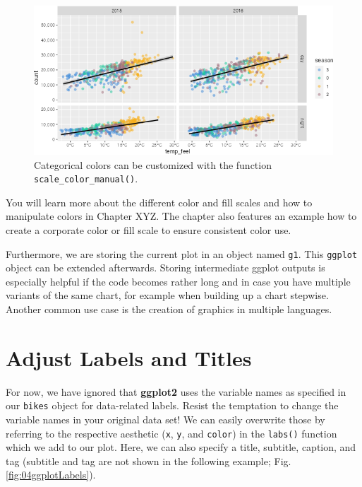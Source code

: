 \documentclass[
]{krantz}
\begin{document}
\begin{figure}
\centering
\includegraphics{bookdown_files/figure-latex/04ggplotColors-1.png}
\caption{\label{fig:04ggplotColors}Categorical colors can be customized with the function \texttt{scale\_color\_manual()}.}
\end{figure}

You will learn more about the different color and fill scales and how to manipulate colors in Chapter XYZ. The chapter also features an example how to create a corporate color or fill scale to ensure consistent color use.

Furthermore, we are storing the current plot in an object named \texttt{g1}. This \texttt{ggplot} object can be extended afterwards. Storing intermediate ggplot outputs is especially helpful if the code becomes rather long and in case you have multiple variants of the same chart, for example when building up a chart stepwise. Another common use case is the creation of graphics in multiple languages.

\hypertarget{label-adjustment}{%
\section{Adjust Labels and Titles}\label{label-adjustment}}

For now, we have ignored that \textbf{ggplot2} uses the variable names as specified in our \texttt{bikes} object for data-related labels. Resist the temptation to change the variable names in your original data set! We can easily overwrite those by referring to the respective aesthetic (\texttt{x}, \texttt{y}, and \texttt{color}) in the \texttt{labs()} function which we add to our plot. Here, we can also specify a title, subtitle, caption, and tag (subtitle and tag are not shown in the following example; Fig. \ref{fig:04ggplotLabels}).
\end{document}

